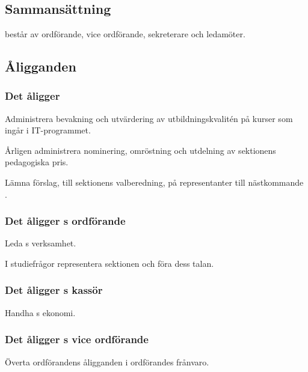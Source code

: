 \section{\SNITFULL}


\subsection{Sammansättning}
\SNIT{} består av ordförande, vice ordförande, sekreterare och ledamöter.

\subsection{Åligganden}

\subsubsection{Det åligger \SNIT}

\begin{att}
	\item Administrera bevakning och utvärdering av utbildningskvalitén på kurser som ingår i IT-programmet.
	\item Årligen administrera nominering, omröstning och utdelning av sektionens pedagogiska pris.
	\item Lämna förslag, till sektionens valberedning, på representanter till nästkommande \SNIT.
\end{att}

\subsubsection{Det åligger \SNIT{}s ordförande}
\begin{att}
	\item Leda \SNIT{}s verksamhet.
	\item I studiefrågor representera sektionen och föra dess talan.
\end{att}

\subsubsection{Det åligger \SNIT{}s kassör}
\begin{att}
	\item Handha \SNIT{}s ekonomi.
\end{att}

\subsubsection{Det åligger \SNIT{}s vice ordförande}
\begin{att}
	\item Överta ordförandens åligganden i ordförandes frånvaro.
\end{att}

